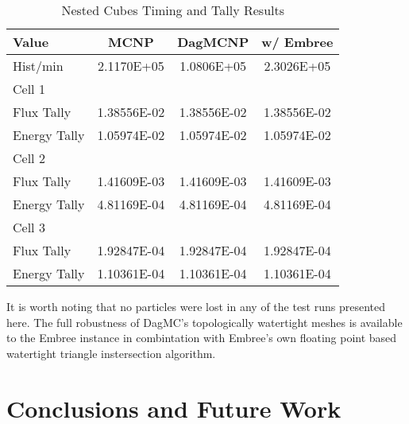 \documentclass{anstrans}
\begin{document}
\begin{table}[h]

  \begin{center}
    \caption{Nested Cubes Timing and Tally Results}
    
    \begin{tabular}{lccc}
      \toprule
      Value & MCNP & DagMCNP & w/ Embree \\
      \toprule
      Hist/min & 2.1170E+05 & 1.0806E+05 & 2.3026E+05 \\
      \hline
      Cell 1 & & & \\
      Flux Tally & 1.38556E-02 & 1.38556E-02 & 1.38556E-02 \\
      Energy Tally & 1.05974E-02 & 1.05974E-02 & 1.05974E-02 \\
      \hline
      Cell 2 & & & \\
      Flux Tally & 1.41609E-03 & 1.41609E-03 & 1.41609E-03 \\
      Energy Tally & 4.81169E-04 & 4.81169E-04 & 4.81169E-04 \\
      \hline
      Cell 3 & & & \\
      Flux Tally & 1.92847E-04 & 1.92847E-04 & 1.92847E-04 \\
      Energy Tally & 1.10361E-04 & 1.10361E-04 & 1.10361E-04 \\
      \bottomrule
      
                        
    \end{tabular}


  \end{center}

\end{table}

It is worth noting that no particles were lost in any of the test runs presented here. The full robustness of DagMC's topologically watertight meshes \cite{make_watertight_smith_2010} is available to the Embree instance in combintation with Embree's own floating point based watertight triangle instersection algorithm. \cite{watertight_tri_intersection_woop_2013}

\section{Conclusions and Future Work}
\end{document}
